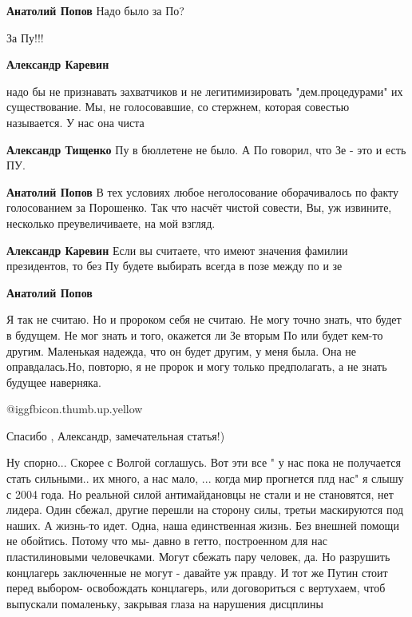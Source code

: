 \begin{itemize}
\begin{itemize}
\textbf{Анатолий Попов} Надо было за По?

За Пу!!!

\textbf{Александр Каревин} 

надо бы не признавать захватчиков и не легитимизировать "дем.процедурами" их
существование. Мы, не голосовавшие, со стержнем, которая совестью называется. У
нас она чиста

\textbf{Александр Тищенко} Пу в бюллетене не было. А По говорил, что Зе - это и есть ПУ.

\textbf{Анатолий Попов} В тех условиях любое неголосование оборачивалось по факту голосованием за Порошенко. Так что насчёт чистой совести, Вы, уж извините, несколько преувеличиваете, на мой взгляд.

\textbf{Александр Каревин} Если вы считаете, что имеют значения фамилии президентов, то без Пу будете выбирать всегда в позе между по и зе

\textbf{Анатолий Попов} 

Я так не считаю. Но и пророком себя не считаю. Не могу точно знать, что будет в
будущем. Не мог знать и того, окажется ли Зе вторым По или будет кем-то другим.
Маленькая надежда, что он будет другим, у меня была. Она не оправдалась.Но,
повторю, я не пророк и могу только предполагать, а не знать будущее наверняка.

\end{itemize} %

 @igg{fbicon.thumb.up.yellow} 

Спасибо , Александр, замечательная статья!)


Ну спорно... Скорее с Волгой соглашусь. Вот эти все " у нас пока не получается
стать сильными.. их много, а нас мало, ... когда мир прогнется плд нас" я слышу
с 2004 года. Но реальной силой антимайдановцы не стали и не становятся, нет
лидера. Один сбежал, другие перешли на сторону силы, третьи маскируются под
наших. А жизнь-то идет. Одна, наша единственная жизнь. Без внешней помощи не
обойтись. Потому что мы- давно в гетто, построенном для нас пластилиновыми
человечками. Могут сбежать пару человек, да. Но разрушить концлагерь
заключенные не могут - давайте уж правду. И тот же Путин стоит перед выбором-
освобождать концлагерь, или договориться с вертухаем, чтоб выпускали
помаленьку, закрывая глаза на нарушения дисцплины


\end{itemize}
